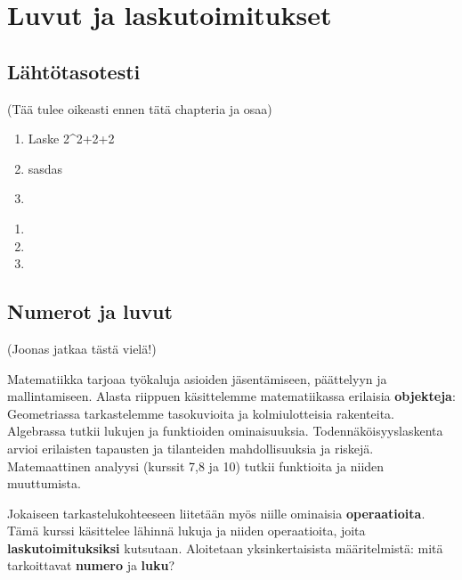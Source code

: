 


\part{Luvut ja laskutoimitukset}
\chapter{Lähtötasotesti}

(Tää tulee oikeasti ennen tätä chapteria ja osaa)

\begin{tehtävä}
\begin{enumerate}
\item Laske 2^2+2+2
\item sasdas
\item 
\end{enumerate}

\begin{vastaus}
\begin{enumerate}
\item 
\item
\item

\end{enumerate}
\end{vastaus}
\end{tehtävä}
\chapter{Numerot ja luvut}

(Joonas jatkaa tästä vielä!)

Matematiikka tarjoaa työkaluja asioiden jäsentämiseen, päättelyyn ja mallintamiseen. Alasta riippuen käsittelemme matematiikassa erilaisia \textbf{objekteja}: Geometriassa tarkastelemme tasokuvioita ja kolmiulotteisia rakenteita. Algebrassa tutkii lukujen ja funktioiden ominaisuuksia. Todennäköisyyslaskenta arvioi erilaisten tapausten ja tilanteiden mahdollisuuksia ja riskejä. Matemaattinen analyysi (kurssit 7,8 ja 10) tutkii funktioita ja niiden muuttumista.

Jokaiseen tarkastelukohteeseen liitetään myös niille ominaisia \textbf{operaatioita}. Tämä kurssi käsittelee lähinnä lukuja ja niiden operaatioita, joita \textbf{laskutoimituksiksi} kutsutaan. Aloitetaan yksinkertaisista määritelmistä: mitä tarkoittavat \textbf{numero} ja \textbf{luku}?


